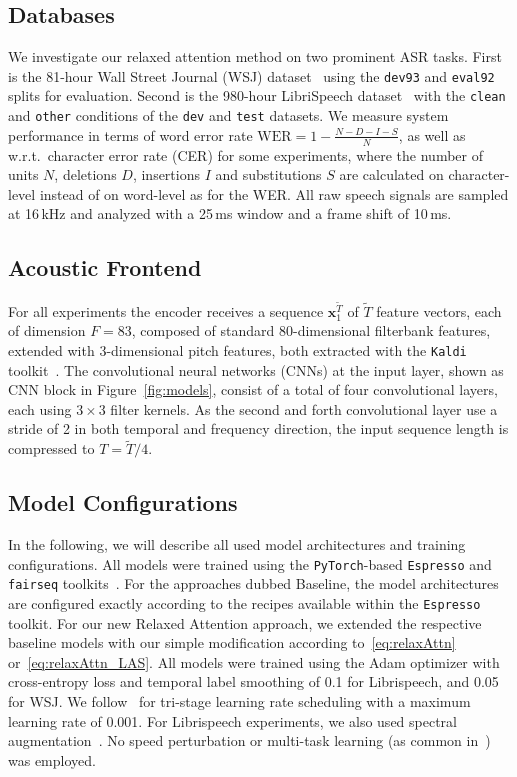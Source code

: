 \documentclass{article}
\newcommand{\VEC}[1]{\mathbf{#1}}          \newcommand{\VECG}[1]{\boldmath{#1}}     \newcommand{\MAT}[1]{\mathbf{#1}}          \newcommand{\MATG}[1]{\boldsymbol{#1}}
\def\espresso{\texttt{Espresso}\xspace}
\def\fairseq{\texttt{fairseq}\xspace}
\def\pytorch{\texttt{PyTorch}\xspace}
\begin{document}
\subsection{Databases}	\vspace{-2mm}
We investigate our relaxed attention method on two prominent ASR tasks. First is the 81-hour Wall Street Journal (WSJ) dataset~\cite{paul1992} using the \texttt{dev93} and \texttt{eval92} splits for evaluation. Second is the 980-hour LibriSpeech dataset~\cite{Panayotov2015} with the \texttt{clean} and \texttt{other} conditions of the \texttt{dev} and \texttt{test} datasets. We measure system performance in terms of word error rate $\mathrm{WER}=1-\frac{N-D-I-S}{N}$, as well as w.r.t.\ character error rate (CER) for some experiments, where the number of units $N$, deletions $D$, insertions $I$ and substitutions $S$ are calculated on character-level instead of on word-level as for the WER. All raw speech signals are sampled at 16\,kHz and analyzed with a 25\,ms window and a frame shift of 10\,ms. 
\vspace{-2mm}
\subsection{Acoustic Frontend}\label{sec:frontend}\vspace{-2.5mm}
For all experiments the encoder receives a sequence $\VEC{x}_1^{\tilde{T}}$ of $\tilde{T}$ feature vectors, each of dimension $F\!=\!83$, composed of standard 80-di\-men\-sion\-al filterbank features, extended with 3-dimensional pitch features, both extracted with the \texttt{Kaldi} toolkit~\cite{Povey2011}. The convolutional neural networks (CNNs) at the input layer, shown as CNN block in Figure~\ref{fig:models}, consist of a total of four convolutional layers, each using $3\!\times\!3$ filter kernels. As the second and forth convolutional layer use a stride of 2 in both temporal and frequency direction, the input sequence length is compressed to $T=\tilde{T}/4$. 
\vspace{-2mm}
\subsection{Model Configurations}\vspace{-2mm}
In the following, we will describe all used model architectures and training configurations. All models were trained using the \pytorch-based \espresso and \fairseq tool\-kits~\cite{Paszke2019,ott2019,wang2019e}. For the approaches dubbed \textsf{Baseline}, the model architectures are configured exactly according to the recipes available within the \espresso toolkit. For our new \textsf{Relaxed Attention} approach, we extended the respective baseline models with our simple modification according to~\eqref{eq:relaxAttn} or~\eqref{eq:relaxAttn_LAS}. All models were trained using the Adam optimizer with cross-entropy loss and temporal label smoothing of 0.1 for Librispeech, and 0.05 for WSJ. We follow~\cite{Dong2018c} for tri-stage learning rate scheduling with a maximum learning rate of 0.001. For Librispeech experiments, we also used spectral augmentation~\cite{Park2019d}. No speed perturbation or multi-task learning (as common in~\cite{Karita2019b,Guo2021}) was employed.
\vspace{-2mm}
\end{document}
